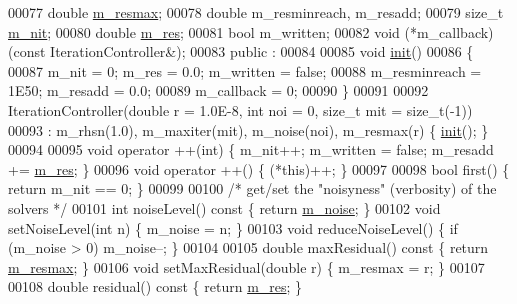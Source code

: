 \begin{DoxyCode}
00077     \textcolor{keywordtype}{double} \hyperlink{class_eigen_1_1_iteration_controller_a5342235a082ee820516fd593ee1efeac}{m\_resmax};      
00078     \textcolor{keywordtype}{double} m\_resminreach, m\_resadd;
00079     \textcolor{keywordtype}{size\_t} \hyperlink{class_eigen_1_1_iteration_controller_ac9d122615471416cc827a3d8e8ea15f2}{m\_nit};         
00080     \textcolor{keywordtype}{double} \hyperlink{class_eigen_1_1_iteration_controller_af60d33d2bdd09f3d00fd73ddc91fc1e6}{m\_res};         
00081     \textcolor{keywordtype}{bool} m\_written;
00082     void (*m\_callback)(\textcolor{keyword}{const} IterationController&);
00083   public :
00084 
00085     \textcolor{keywordtype}{void} \hyperlink{structinit}{init}()
00086     \{
00087       m\_nit = 0; m\_res = 0.0; m\_written = \textcolor{keyword}{false};
00088       m\_resminreach = 1E50; m\_resadd = 0.0;
00089       m\_callback = 0;
00090     \}
00091 
00092     IterationController(\textcolor{keywordtype}{double} r = 1.0E-8, \textcolor{keywordtype}{int} noi = 0, \textcolor{keywordtype}{size\_t} mit = \textcolor{keywordtype}{size\_t}(-1))
00093       : m\_rhsn(1.0), m\_maxiter(mit), m\_noise(noi), m\_resmax(r) \{ \hyperlink{structinit}{init}(); \}
00094 
00095     \textcolor{keywordtype}{void} operator ++(\textcolor{keywordtype}{int}) \{ m\_nit++; m\_written = \textcolor{keyword}{false}; m\_resadd += \hyperlink{class_eigen_1_1_iteration_controller_af60d33d2bdd09f3d00fd73ddc91fc1e6}{m\_res}; \}
00096     \textcolor{keywordtype}{void} operator ++() \{ (*this)++; \}
00097 
00098     \textcolor{keywordtype}{bool} first() \{ \textcolor{keywordflow}{return} m\_nit == 0; \}
00099 
00100     \textcolor{comment}{/* get/set the "noisyness" (verbosity) of the solvers */}
00101     \textcolor{keywordtype}{int} noiseLevel()\textcolor{keyword}{ const }\{ \textcolor{keywordflow}{return} \hyperlink{class_eigen_1_1_iteration_controller_afcff4288066c186967f15defcd833f5d}{m\_noise}; \}
00102     \textcolor{keywordtype}{void} setNoiseLevel(\textcolor{keywordtype}{int} n) \{ m\_noise = n; \}
00103     \textcolor{keywordtype}{void} reduceNoiseLevel() \{ \textcolor{keywordflow}{if} (m\_noise > 0) m\_noise--; \}
00104 
00105     \textcolor{keywordtype}{double} maxResidual()\textcolor{keyword}{ const }\{ \textcolor{keywordflow}{return} \hyperlink{class_eigen_1_1_iteration_controller_a5342235a082ee820516fd593ee1efeac}{m\_resmax}; \}
00106     \textcolor{keywordtype}{void} setMaxResidual(\textcolor{keywordtype}{double} r) \{ m\_resmax = r; \}
00107 
00108     \textcolor{keywordtype}{double} residual()\textcolor{keyword}{ const }\{ \textcolor{keywordflow}{return} \hyperlink{class_eigen_1_1_iteration_controller_af60d33d2bdd09f3d00fd73ddc91fc1e6}{m\_res}; \}

\end{DoxyCode}
